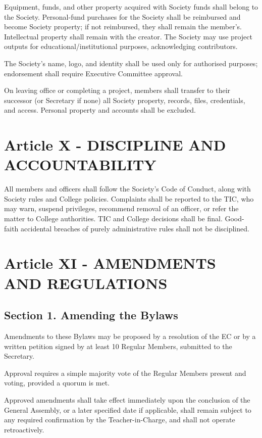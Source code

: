 \documentclass[a4paper]{article}
\begin{document}
Equipment, funds, and other property acquired with Society funds shall belong to the Society. Personal-fund purchases for the Society shall be reimbursed and become Society property; if not reimbursed, they shall remain the member’s. Intellectual property shall remain with the creator. The Society may use project outputs for educational/institutional purposes, acknowledging contributors.

The Society’s name, logo, and identity shall be used only for authorised purposes; endorsement shall require Executive Committee approval.

On leaving office or completing a project, members shall transfer to their successor (or Secretary if none) all Society property, records, files, credentials, and access. Personal property and accounts shall be excluded.

\section*{Article X - DISCIPLINE AND ACCOUNTABILITY}

All members and officers shall follow the Society’s Code of Conduct, along with Society rules and College policies. Complaints shall be reported to the TIC, who may warn, suspend privileges, recommend removal of an officer, or refer the matter to College authorities. TIC and College decisions shall be final. Good-faith accidental breaches of purely administrative rules shall not be disciplined.

\section*{Article XI - AMENDMENTS AND REGULATIONS}

\subsection*{Section 1. Amending the Bylaws}
Amendments to these Bylaws may be proposed by a resolution of the EC or by a written petition signed by at least 10 Regular Members, submitted to the Secretary.

Approval requires a simple majority vote of the Regular Members present and voting, provided a quorum is met.

Approved amendments shall take effect immediately upon the conclusion of the General Assembly, or a later specified date if applicable, shall remain subject to any required confirmation by the Teacher-in-Charge, and shall not operate retroactively.
\end{document}
